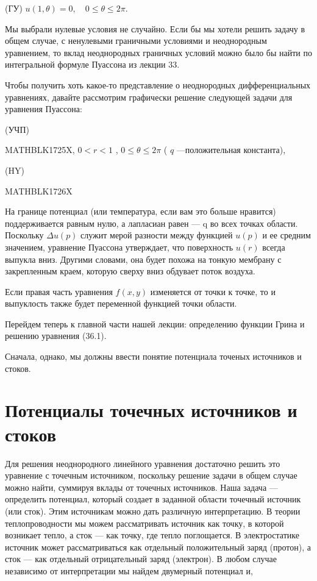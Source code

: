 \documentclass[
]{article}
\begin{document}
{{{(ГУ) \(u(1, \theta) = 0, \quad 0 \le \theta \le 2\pi.\)

Мы выбрали нулевые условия не случайно. Если бы мы хотели решить задачу
в общем случае, с ненулевыми граничными условиями и неоднородным
уравнением, то вклад неоднородных граничных условий можно было бы найти
по интегральной формуле Пуассона из лекции 33.

Чтобы получить хоть какое-то представление о неоднородных
дифференциальных уравнениях, давайте рассмотрим графически решение
следующей задачи для уравнения Пуассона:

(УЧП)

MATHBLK1725X, \(0 < r < 1\) , \(0 \le \theta \le 2\pi\) ( \(q\)
---положительная константа),

(HY)

MATHBLK1726X

На границе потенциал (или температура, если вам это больше нравится)
поддерживается равным нулю, а лапласиан равен --- q во всех точках
области. Поскольку \(\Delta u\left(p\right)\) служит мерой разности
между функцией \(u\left(p\right)\) и ее средним значением, уравнение
Пуассона утверждает, что поверхность \(u\left(r\right)\) всегда выпукла
вниз. Другими словами, она будет похожа на тонкую мембрану с
закрепленным краем, которую сверху вниз обдувает поток воздуха.

Если правая часть уравнения \(f(x, y)\) изменяется от точки к точке, то
и выпуклость также будет переменной функцией точки области.

Перейдем теперь к главной части нашей лекции: определению функции Грина
и решению уравнения (36.1).

Сначала, однако, мы должны ввести понятие потенциала точеных источников
и стоков.

\section{Потенциалы точечных источников и
стоков}\label{ux43fux43eux442ux435ux43dux446ux438ux430ux43bux44b-ux442ux43eux447ux435ux447ux43dux44bux445-ux438ux441ux442ux43eux447ux43dux438ux43aux43eux432-ux438-ux441ux442ux43eux43aux43eux432}

Для решения неоднородного линейного уравнения достаточно решить это
уравнение с точечным источником, поскольку решение задачи в общем случае
можно найти, суммируя вклады от точечных источников. Наша задача ---
определить потенциал, который создает в заданной области точечный
источник (или сток). Этим источникам можно дать различную интерпретацию.
В теории теплопроводности мы можем рассматривать источник как точку, в
которой возникает тепло, а сток --- как точку, где тепло поглощается. В
электростатике источник может рассматриваться как отдельный
положительный заряд (протон), а сток --- как отдельный отрицательный
заряд (электрон). В любом случае независимо от интерпретации мы найдем
двумерный потенциал и,

}}}
\end{document}
